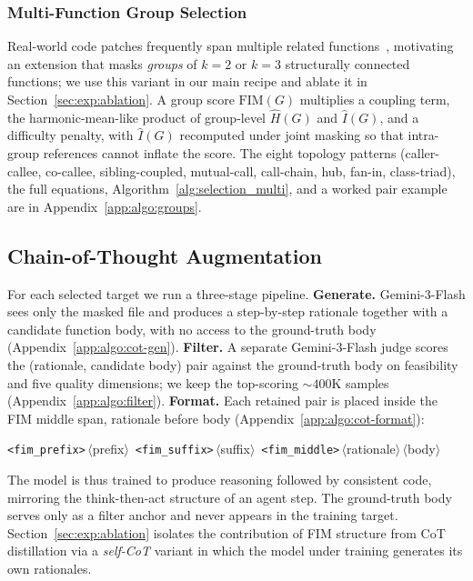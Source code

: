 \subsubsection{Multi-Function Group Selection}
\label{sec:method:groups}

Real-world code patches frequently span multiple related
functions~\citep{swebench}, motivating an extension that masks
\emph{groups} of $k\!=\!2$ or $k\!=\!3$ structurally connected functions;
we use this variant in our main recipe and ablate it in
Section~\ref{sec:exp:ablation}. A group score $\mathrm{FIM}(G)$
multiplies a coupling term, the harmonic-mean-like product of
group-level $\hat{H}(G)$ and $\hat{I}(G)$, and a difficulty penalty,
with $\hat{I}(G)$ recomputed under joint masking so that intra-group
references cannot inflate the score. The eight topology patterns
(caller-callee, co-callee, sibling-coupled, mutual-call, call-chain,
hub, fan-in, class-triad), the full equations,
Algorithm~\ref{alg:selection_multi}, and a worked pair example are in
Appendix~\ref{app:algo:groups}.

\vspace{-0.5ex}
\subsection{Chain-of-Thought Augmentation}
\label{sec:method:cot}
For each selected target we run a three-stage pipeline.
\textbf{Generate.} Gemini-3-Flash sees only the masked file and
produces a step-by-step rationale together with a candidate function
body, with no access to the ground-truth body
(Appendix~\ref{app:algo:cot-gen}).
\textbf{Filter.} A separate Gemini-3-Flash judge scores the
(rationale, candidate body) pair against the ground-truth body on
feasibility and five quality dimensions; we keep the top-scoring
$\sim\!400$K samples (Appendix~\ref{app:algo:filter}).
\textbf{Format.} Each retained pair is placed inside the FIM middle
span, rationale before body (Appendix~\ref{app:algo:cot-format}):
\vspace{-0.5ex}
\begin{center}\small
\texttt{<fim\_prefix>}\,$\langle$prefix$\rangle$\,%
\texttt{<fim\_suffix>}\,$\langle$suffix$\rangle$\,%
\texttt{<fim\_middle>}\,$\langle$rationale$\rangle$\,$\langle$body$\rangle$
\end{center}
\vspace{-1ex}
The model is thus trained to produce reasoning followed by consistent
code, mirroring the think-then-act structure of an agent step. The
ground-truth body serves only as a filter anchor and never appears in
the training target.
Section~\ref{sec:exp:ablation} isolates the contribution of FIM
structure from CoT distillation via a \emph{self-CoT} variant in
which the model under training generates its own rationales.

